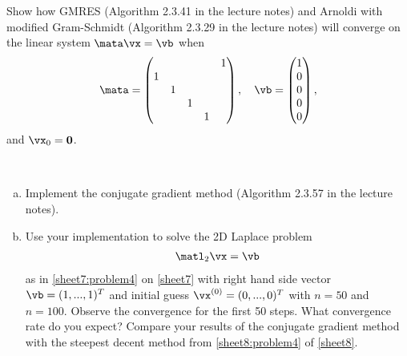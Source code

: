 \begin{Sheet}
  \begin{Problem}
    Show how GMRES (Algorithm 2.3.41 in the lecture notes) and Arnoldi
    with modified Gram-Schmidt (Algorithm 2.3.29 in the lecture notes)
    will converge on the linear system $\mata\vx=\vb$ when
    \begin{gather*}
      \mata =
      \begin{pmatrix}
        &&&&1\\
        1&&&&\\
        &1&&&\\
        &&1&&\\
        &&&1&
      \end{pmatrix},
      \quad
      \vb =
      \begin{pmatrix}
        1\\ 0\\ 0\\ 0\\ 0
      \end{pmatrix},
    \end{gather*}
    and $\vx_0 = \boldsymbol 0$.
  \end{Problem}

  \begin{Problem}[Programming]
    \hfill\\\vspace{-4ex}
    \begin{enumerate}[(a)]
    \item Implement the conjugate gradient method (Algorithm 2.3.57 in
      the lecture notes).
    \item Use your implementation to solve the 2D Laplace problem
      \begin{gather*}
        \matl_2\vx=\vb
      \end{gather*}
      as in \cref{sheet7:problem4} on \cref{sheet7} with right hand
      side vector $\vb=(1,...,1)^T$ and initial guess
      $\vx^{(0)}=(0,...,0)^T$ with $n=50$ and $n=100$. Observe the
      convergence for the first 50 steps. What convergence rate do you
      expect? Compare your results of the conjugate gradient method
      with the steepest decent method from \cref{sheet8:problem4} of
      \cref{sheet8}.
    \end{enumerate}
  \end{Problem}

  \vfill
  
  
\end{Sheet}


